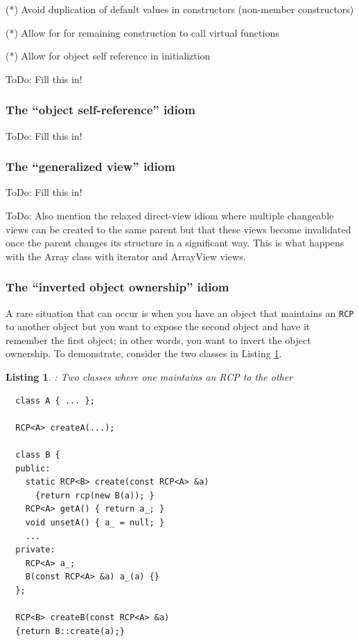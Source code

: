 \documentclass[pdf,ps2pdf,11pt]{SANDreport}
\newtheorem{listing}{Listing}
\begin{document}
(*) Avoid duplication of default values in constructors (non-member
constructors)

(*) Allow for for remaining construction to call virtual functions

(*) Allow for object self reference in initializtion

ToDo: Fill this in!


%
{}\subsubsection{The ``object self-reference'' idiom}
\label{sec:self-references}
%

ToDo: Fill this in!


%
{}\subsubsection{The ``generalized view'' idiom}
\label{sec:generalized-view-idiom}
%

ToDo: Fill this in!

ToDo: Also mention the relaxed direct-view idiom where multiple
changeable views can be created to the same parent but that these
views become invalidated once the parent changes its structure in a
significant way.  This is what happens with the Array class with
iterator and ArrayView views.


%
{}\subsubsection{The ``inverted object ownership'' idiom}
\label{sec:inverting-obj-ownership}
%

A rare situation that can occur is when you have an object that
maintains an {}\texttt{RCP} to another object but you want to expose
the second object and have it remember the first object; in other
words, you want to invert the object ownership.  To demonstrate,
consider the two classes in Listing {}\ref{listing:B_owns_A_decl}.

\begin{listing}: Two classes where one maintains an RCP to the other \\
\label{listing:B_owns_A_decl}
{\small\begin{verbatim}
  class A { ... };

  RCP<A> createA(...);

  class B {
  public:
    static RCP<B> create(const RCP<A> &a)
      {return rcp(new B(a)); }
    RCP<A> getA() { return a_; }
    void unsetA() { a_ = null; }
    ...
  private:
    RCP<A> a_;
    B(const RCP<A> &a) a_(a) {}
  };

  RCP<B> createB(const RCP<A> &a)
  {return B::create(a);}
\end{verbatim}}
\end{listing}
\end{document}
